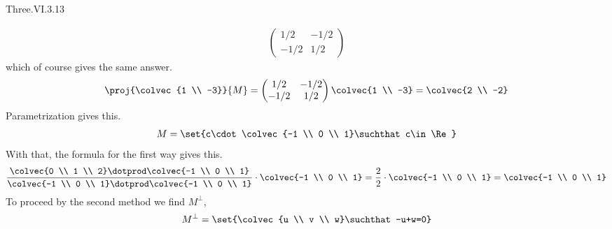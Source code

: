 \begin{ans}{Three.VI.3.13}
\begin{exparts}
\begin{multline*}
             \begin{pmatrix}
               1/2  &-1/2  \\
              -1/2  &1/2
             \end{pmatrix}
           \end{multline*}
           which of course gives the same answer.
           \begin{equation*}
             \proj{\colvec{1 \\ -3}}{M}
             =
             \begin{pmatrix}
               1/2  &-1/2  \\
              -1/2  &1/2
             \end{pmatrix}
             \colvec{1 \\ -3}
             =\colvec{2 \\ -2}
           \end{equation*}
         \partsitem Parametrization gives this.
           \begin{equation*}
             M=\set{c\cdot\colvec{-1 \\ 0 \\ 1}\suchthat c\in\Re}
           \end{equation*}
           With that, the formula for the first way gives this.
           \begin{equation*}
             \frac{\colvec{0 \\ 1 \\ 2}\dotprod\colvec{-1 \\ 0 \\ 1}}{
                   \colvec{-1 \\ 0 \\ 1}\dotprod\colvec{-1 \\ 0 \\ 1}}
               \cdot\colvec{-1 \\ 0 \\ 1}
             =\frac{2}{2}
               \cdot\colvec{-1 \\ 0 \\ 1}
             =\colvec{-1 \\ 0 \\ 1}
           \end{equation*}
           To proceed by the second method we find $M^\perp$,
           \begin{equation*}
             M^\perp
             =\set{\colvec{u \\ v \\ w}\suchthat -u+w=0}

\end{equation*}
\end{exparts}
\end{ans}
